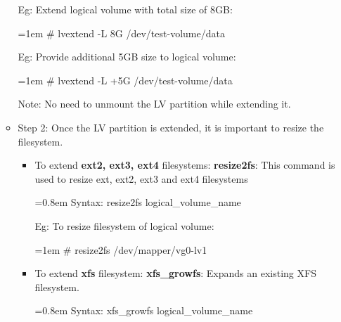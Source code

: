 \begin{flushleft}
\begin{itemize}
\begin{itemize}
			Eg: Extend logical volume with total size of 8GB:
		
			\begin{tcolorbox}[breakable,notitle,boxrule=-0pt,colback=black,colframe=black]
				\color{green}
				\font=1em
				\# lvextend -L 8G /dev/test-volume/data
				\font=4pt
			\end{tcolorbox}
		
			Eg: Provide additional 5GB size to logical volume:
			\bigskip
			\begin{tcolorbox}[breakable,notitle,boxrule=-0pt,colback=black,colframe=black]
				\color{green}
				\font=1em
				\# lvextend -L +5G /dev/test-volume/data
				\font=4pt
			\end{tcolorbox}
			
			\bigskip
			\begin{tcolorbox}[breakable,notitle,boxrule=-0pt,colback=yellow,colframe=yellow]
				\color{black}
				Note: No need to unmount the LV partition while extending it.
			\end{tcolorbox}
			
			
			\item Step 2:
			\newline
			Once the LV partition is extended, it is important to resize the filesystem.
			\begin{itemize}
				\item To extend \textbf{ext2, ext3, ext4} filesystems:
				\newline
				\textbf{resize2fs}: This command is used to resize ext, ext2, ext3 and ext4 filesystems
					\begin{tcolorbox}[breakable,notitle,boxrule=-0pt,colback=pink,colframe=pink]
						\color{black}
						\font=0.8em
						Syntax: resize2fs logical\_volume\_name
						\font=4pt
					\end{tcolorbox}
					
					Eg: To resize filesystem of logical volume:
					\begin{tcolorbox}[breakable,notitle,boxrule=-0pt,colback=black,colframe=black]
						\color{green}
						\fontdimen2\font=1em
						\# resize2fs /dev/mapper/vg0-lv1
						\fontdimen2\font=4pt
					\end{tcolorbox}

			\item To extend \textbf{xfs} filesystem:
			\newline
			\textbf{xfs\_growfs}: Expands an existing XFS filesystem.
			\begin{tcolorbox}[breakable,notitle,boxrule=-0pt,colback=pink,colframe=pink]
				\color{black}
				\font=0.8em
				Syntax: xfs\_growfs logical\_volume\_name
				\fontdimen2\font=4pt
			\end{tcolorbox}
			

\end{itemize}
\end{itemize}
\end{itemize}
\end{flushleft}
